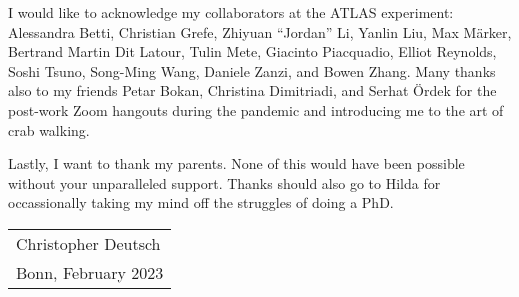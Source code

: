 I would like to acknowledge my collaborators at the ATLAS experiment: Alessandra
Betti, Christian Grefe, Zhiyuan ``Jordan'' Li, Yanlin Liu, Max Märker, Bertrand
Martin Dit Latour, Tulin Mete, Giacinto Piacquadio, Elliot Reynolds, Soshi
Tsuno, Song-Ming Wang, Daniele Zanzi, and Bowen Zhang. Many thanks also to my
\bbtautau friends Petar Bokan, Christina Dimitriadi, and Serhat Ördek for the
post-work Zoom hangouts during the pandemic and introducing me to the art of
crab walking.

Lastly, I want to thank my parents. None of this would have been possible
without your unparalleled support. Thanks should also go to Hilda for
occassionally taking my mind off the struggles of doing a PhD.

\vspace{2\baselineskip}

\hfill%
\begin{tabular}{l}
  Christopher Deutsch \\
  Bonn, February 2023
\end{tabular}

